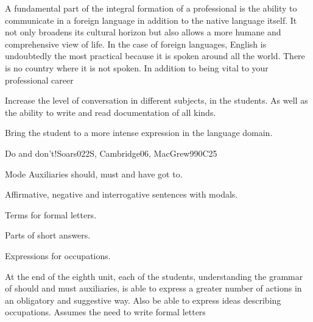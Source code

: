 \begin{syllabus}


\begin{justification}
A fundamental part of the integral formation of a professional is the ability to communicate in a foreign language in addition to the native language itself. It not only broadens its cultural horizon but also allows a more humane and comprehensive view of life. In the case of foreign languages, English is undoubtedly the most practical because it is spoken around
all the world. There is no country where it is not spoken. In addition to being vital to your professional career
\end{justification}

\begin{goals}
\item Increase the level of conversation in different subjects, in the students. As well as the ability to write and read documentation of all kinds.
\item Bring the student to a more intense expression in the language domain.
\end{goals}

\begin{outcomes}
\item {}
\end{outcomes}

\begin{competences}
\item {}
\end{competences}


\begin{unit}{Do and don't!}{}{Soars022S, Cambridge06, MacGrew99}{0}{C25}
   \begin{topics}
      \item Mode Auxiliaries should, must and have got to.
      \item Affirmative, negative and interrogative sentences with modals.
      \item Terms for formal letters.
      \item Parts of short answers.
      \item Expressions for occupations.
   \end{topics}

   \begin{learningoutcomes}
      \item At the end of the eighth unit, each of the students, understanding the grammar of should and must auxiliaries, is able to express a greater number of actions in an obligatory and suggestive way.
            Also be able to express ideas describing occupations. Assumes the need to write formal letters
   \end{learningoutcomes}
\end{unit}


\end{syllabus}
